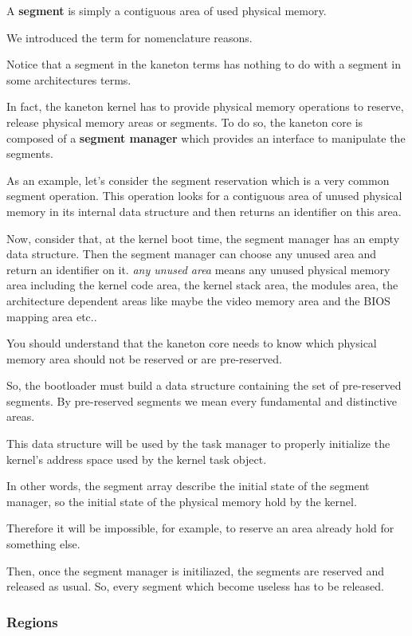 A \textbf{segment} is simply a contiguous area of used physical memory.

We introduced the term for nomenclature reasons.

Notice that a segment in the kaneton terms has nothing to do with
a segment in some architectures terms.

In fact, the kaneton kernel has to provide physical memory operations to
reserve, release physical memory areas or segments. To do so, the kaneton
core is composed of a \textbf{segment manager} which provides an interface
to manipulate the segments.

As an example, let's consider the segment reservation which is a very
common segment operation. This operation looks for a contiguous area
of unused physical memory in its internal data structure and then
returns an identifier on this area.

Now, consider that, at the kernel boot time, the segment manager has
an empty data structure. Then the segment manager can choose any
unused area and return an identifier on it. \textit{any unused area} means
any unused physical memory area including the kernel code area, the kernel
stack area, the modules area, the architecture dependent areas like maybe the
video memory area and the BIOS mapping area etc..

You should understand that the kaneton core needs to know which physical
memory area should not be reserved or are pre-reserved.

So, the bootloader must build a data structure containing the set of
pre-reserved segments. By pre-reserved segments we mean every fundamental
and distinctive areas.

This data structure will be used by the task manager to properly
initialize the kernel's address space used by the kernel task object.

In other words, the segment array describe the initial state of the
segment manager, so the initial state of the physical memory hold by the
kernel.

Therefore it will be impossible, for example, to reserve an area
already hold for something else.

Then, once the segment manager is initiliazed, the segments are reserved
and released as usual. So, every segment which become useless has to be
released.

\subsubsection{Regions}

